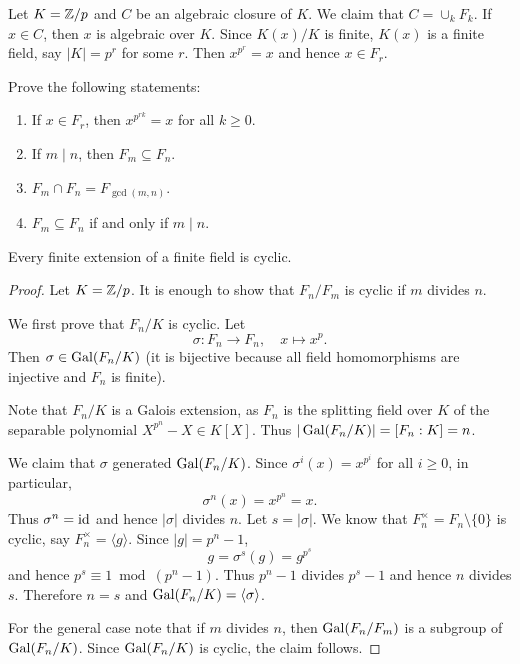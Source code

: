 Let $K=\mathbb{Z}/p$ and $C$ be an algebraic closure of $K$. 
We claim that $C=\cup_k F_k$. If $x\in C$, then $x$ is algebraic over $K$. 
Since $K(x)/K$ is finite, $K(x)$ is a finite field, say 
$|K|=p^r$ for some $r$. Then $x^{p^r}=x$ and hence $x\in F_r$. 

\begin{exercise}
    Prove the following statements:
    \begin{enumerate}
        \item If $x\in F_r$, then $x^{p^{rk}}=x$ for all $k\geq0$.
        \item If $m\mid n$, then $F_m\subseteq F_n$. 
        \item $F_m\cap F_n=F_{\gcd(m,n)}$.
        \item $F_m\subseteq F_n$ if and only if $m\mid n$. 
    \end{enumerate}
\end{exercise}

\begin{proposition}
    Every finite extension of a finite field is cyclic. 
\end{proposition}

\begin{proof}
    Let $K=\mathbb{Z}/p$. It is enough to show that $F_n/F_m$ is cyclic if $m$ divides $n$. 
    
    We first prove that $F_n/K$ is cyclic. 
    Let 
    \[
    \sigma\colon F_n\to F_n,\quad 
    x\mapsto x^p.
    \]
    Then 
    $\sigma\in\operatorname{Gal}(F_n/K)$ (it is bijective because all field homomorphisms 
    are injective and $F_n$ is finite). 

    Note that 
    $F_n/K$ is a Galois extension, as $F_n$ is the splitting
    field over $K$ 
    of the separable polynomial $X^{p^n}-X\in K[X]$. 
    Thus $|\operatorname{Gal}(F_n/K)|=[F_n:K]=n$. 
    
    We claim that $\sigma$ generated $\operatorname{Gal}(F_n/K)$. Since 
    $\sigma^i(x)=x^{p^i}$ for all $i\geq 0$, in particular, 
    \[
    \sigma^n(x)=x^{p^n}=x.
    \]
    Thus $\sigma^n=\operatorname{id}$ and hence $|\sigma|$ divides $n$. Let 
    $s=|\sigma|$. We know that $F_n^{\times}=F_n\setminus\{0\}$ is
    cyclic, say $F_n^{\times}=\langle g\rangle$. Since $|g|=p^n-1$, 
    \[
    g=\sigma^s(g)=g^{p^s}
    \]
    and hence $p^s\equiv 1\bmod (p^n-1)$. Thus $p^n-1$ divides $p^s-1$ and
    hence $n$ divides $s$. Therefore $n=s$ and $\operatorname{Gal}(F_n/K)=\langle\sigma\rangle$. 
    
    For the general case note that if $m$ divides $n$, 
    then $\operatorname{Gal}(F_n/F_m)$ is a subgroup of $\operatorname{Gal}(F_n/K)$. Since  $\operatorname{Gal}(F_n/K)$ is cyclic, 
    the claim follows.
\end{proof}

